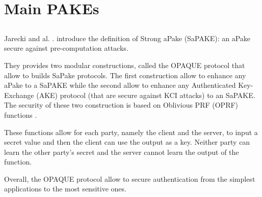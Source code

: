 \documentclass[../report.tex]{subfiles}
\begin{document}
\section{Main PAKEs}

\subsection{}


\paragraph{}
Jarecki and al. \cite{OPAQUE_Paper}. introduce the definition of Strong aPake (SaPAKE): an aPake secure against pre-computation attacks.

They provides two modular constructions, called the OPAQUE protocol that allow to builds SaPake protocols. The first construction allow to enhance any aPake to a SaPAKE while the second allow to enhance any Authenticated Key-Exchange (AKE) protocol (that are secure against KCI attacks) to an SaPAKE.
The security of these two construction is based on Oblivious PRF (OPRF) functions \cite{}.

These functions allow for each party, namely the client and the server, to input a secret value and then the client can use the output as a key. Neither party can learn the other party's secret and the server cannot learn the output of the function.

Overall, the OPAQUE protocol allow to secure authentication from the simplest applications to the most sensitive ones.


% 
% 
% 


\paragraph{}
\end{document}
